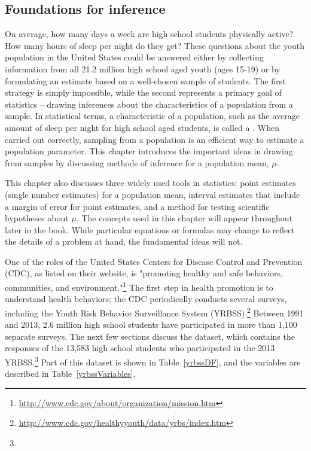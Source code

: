 
\begin{spacing}{1.5}

\chapter{Foundations for inference}
\label{foundationsForInference}

On average, how many days a week are high school students physically active? How many hours of sleep per night do they get? These questions about the youth population in the United States could be answered either by collecting information from all 21.2 million high school aged youth (ages 15-19) or by formulating an estimate based on a well-chosen sample of students. The first strategy is simply impossible, while the second represents a primary goal of statistics -- drawing inferences about the characteristics of a population from a sample. In statistical terms, a characteristic of a population, such as the average amount of sleep per night for high school aged students, is called a . When carried out correctly, sampling from a population is an efficient way to estimate a population parameter. This chapter introduces the important ideas in drawing from samples by discussing methods of inference for a population mean, $\mu$. 

This chapter also discusses three widely used tools in statistics: point estimates (single number estimates) for a population mean, interval estimates that include a margin of error for point estimates, and a method for testing scientific hypotheses about $\mu$. The concepts used in this chapter will appear throughout later in the book. While particular equations or formulas may change to reflect the details of a problem at hand, the fundamental ideas will not. 


One of the roles of the United States Centers for Disease Control and Prevention (CDC), as listed on their website, is "promoting healthy and safe behaviors, communities, and environment."\footnote{\url{http://www.cdc.gov/about/organization/mission.htm}} The first step in health promotion is to understand health behaviors; the CDC periodically conducts several surveys, including the Youth Risk Behavior Surveillance System (YRBSS).\footnote{\url{http://www.cdc.gov/healthyyouth/data/yrbs/index.htm}} Between 1991 and 2013, 2.6 million high school students have participated in more than 1,100 separate surveys. The next few sections discuss the  dataset, which contains the responses of the 13,583 high school students who participated in the 2013 YRBSS.\footnote{} Part of this dataset is shown in Table~\ref{yrbssDF}, and the variables are described in Table~\ref{yrbssVariables}.


\end{spacing}
